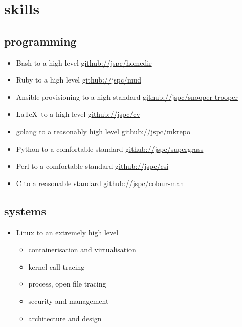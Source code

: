 \documentclass[]{friggeri-cv}
\begin{document}
\section{skills}

\subsection{programming}

\begin{itemize}
\item Bash to a high level \href{https://github.com/jspc/homedir}{github://jspc/homedir}
\item Ruby to a high level \href{https://github.com/jspc/mud}{github://jspc/mud}
\item Ansible provisioning to a high standard \href{https://github.com/jspc/snooper-trooper}{github://jspc/snooper-trooper}
\item \LaTeX \ to a high level \href{https://github.com/jspc/cv}{github://jspc/cv}
\item golang to a reasonably high level \href{https://github.com/jspc/mkrepo}{github://jspc/mkrepo}
\item Python to a comfortable standard \href{https://github.com/jspc/supergrass}{github://jspc/supergrass}
\item Perl to a comfortable standard \href{https://github.com/jspc/csi}{github://jspc/csi}
\item C to a reasonable standard \href{https://github.com/jspc/colour-man}{github://jspc/colour-man}
\end{itemize}

\subsection{systems}

\begin{itemize}
\item Linux to an extremely high level
  \begin{itemize}
  \item containerisation and virtualisation
  \item kernel call tracing
  \item process, open file tracing
  \item security and management
  \item architecture and design
  \end{itemize}
\end{itemize}
\end{document}
